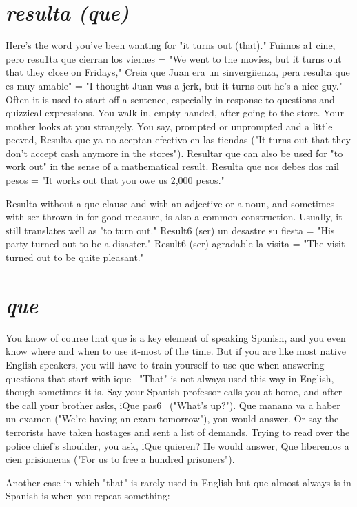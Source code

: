 \documentclass[14pt,a4paper,oneside]{memoir}
\begin{document}
\section{\emph{resulta (que)}}

Here's the word you've been wanting for "it turns out (that)."
Fuimos a1 cine, pero resu1ta que cierran los viernes = "We went to
the movies, but it turns out that they close on Fridays," Creia que
Juan era un sinvergiienza, pera resulta que es muy amable" = "I
thought Juan was a jerk, but it turns out he's a nice guy." Often it is
used to start off a sentence, especially in response to questions and
quizzical expressions. You walk in, empty-handed, after going to the
store. Your mother looks at you strangely. You say, prompted or unprompted and a little peeved, Resulta que ya no aceptan efectivo en
las tiendas ("It turns out that they don't accept cash anymore in the
stores"). Resultar que can also be used for "to work out" in the sense
of a mathematical result. Resulta que nos debes dos mil pesos = "It
works out that you owe us 2,000 pesos."

Resulta without a que clause and with an adjective or a noun,
and sometimes with ser thrown in for good measure, is also a common
construction. Usually, it still translates well as "to turn out." Result6
(ser) un desastre su fiesta = "His party turned out to be a disaster."
Result6 (ser) agradable la visita = "The visit turned out to be quite
pleasant."

\section{\emph{que}}

You know of course that que is a key element of speaking
Spanish, and you even know where and when to use it-most of the
time. But if you are like most native English speakers, you will have
to train yourself to use que when answering questions that start with
ique~ "That" is not always used this way in English, though sometimes it is. Say your Spanish professor calls you at home, and after the
call your brother asks, iQue pas6~ ("What's up?"). Que manana va a
haber un examen ("We're having an exam tomorrow"), you would answer. Or say the terrorists have taken hostages and sent a list of demands. Trying to read over the police chief's shoulder, you ask, iQue
quieren? He would answer, Que liberemos a cien prisioneras ("For us
to free a hundred prisoners").

Another case in which "that" is rarely used in English but que
almost always is in Spanish is when you repeat something:
\end{document}
